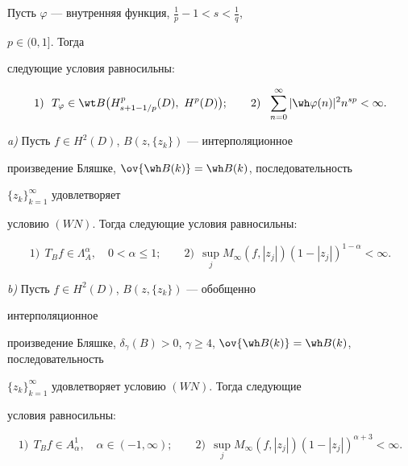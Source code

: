 \begin{thm} 


Пусть $\varphi$ --- внутренняя функция, $\frac{1}{p}-1<s<\frac{1}{q}$, 


$p\in(0,1]$. Тогда 


следующие условия равносильны\/${:}$ 


$$ 


1)\ \ T_\varphi\in\wt B\big(H^p_{s+1-1/p}(D), 


\ H^p(D)\big);\qquad 2)\ \ \sum^\infty_{n=0} 


|\wh\varphi(n)|^2n^{s p}<\infty. 


$$ 


\end{thm} 


 


\begin{thm} 


{\em a)} Пусть $f\in H^2(D)$, $B(z,\{z_k\})$ --- интерполяционное 


произведение Бляшке, $\ov{\wh B(k)}=\wh B(k)$, последовательность 


$\{z_k\}^\infty_{k=1}$ удовлетворяет 


условию $(W N)$. Тогда следующие условия равносильны\/${:}$ 


$$ 


1)\ \ T_B f\in\Lambda^\alpha_A,\quad 0<\alpha\le1;\qquad 


2)\ \ \sup_j M_\infty(f,|z_j|)(1-|z_j|)^{1-\alpha}<\infty. 


$$ 


 


{\em b)} Пусть $f\in H^2(D)$, $B(z,\{z_k\})$ --- обобщенно 


интерполяционное 


произведение Бляшке, $\delta_\gamma(B)>0$, $\gamma\ge4$, $\ov{\wh 


B(k)}=\wh B(k)$, последовательность 


$\{z_k\}^\infty_{k=1}$ удовлетворяет условию $(W N)$. Тогда следующие 


условия равносильны\/${:}$ 


$$ 


1)\ \ T_B f\in A^1_\alpha,\quad \alpha\in(-1,\infty);\qquad 


2)\ \ \sup_j M_\infty(f,|z_j|)(1-|z_j|)^{\alpha+3}<\infty. 


$$ 


\end{thm} 


